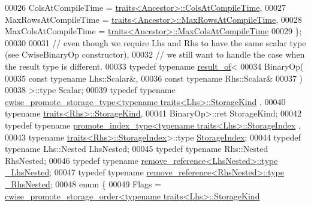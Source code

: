 \begin{DoxyCode}
00026     ColsAtCompileTime = \hyperlink{struct_eigen_1_1internal_1_1traits}{traits<Ancestor>::ColsAtCompileTime},
00027     MaxRowsAtCompileTime = \hyperlink{struct_eigen_1_1internal_1_1traits}{traits<Ancestor>::MaxRowsAtCompileTime},
00028     MaxColsAtCompileTime = \hyperlink{struct_eigen_1_1internal_1_1traits}{traits<Ancestor>::MaxColsAtCompileTime}
00029   \};
00030 
00031   \textcolor{comment}{// even though we require Lhs and Rhs to have the same scalar type (see CwiseBinaryOp constructor),}
00032   \textcolor{comment}{// we still want to handle the case when the result type is different.}
00033   \textcolor{keyword}{typedef} \textcolor{keyword}{typename} \hyperlink{struct_eigen_1_1internal_1_1result__of}{result\_of}<
00034                      BinaryOp(
00035                        \textcolor{keyword}{const} \textcolor{keyword}{typename} Lhs::Scalar&,
00036                        \textcolor{keyword}{const} \textcolor{keyword}{typename} Rhs::Scalar&
00037                      )
00038                    >::type Scalar;
00039   \textcolor{keyword}{typedef} \textcolor{keyword}{typename} \hyperlink{struct_eigen_1_1internal_1_1cwise__promote__storage__type}{cwise\_promote\_storage\_type<typename traits<Lhs>::StorageKind}
      ,
00040                                               \textcolor{keyword}{typename} \hyperlink{struct_eigen_1_1internal_1_1traits}{traits<Rhs>::StorageKind},
00041                                               BinaryOp>::ret StorageKind;
00042   \textcolor{keyword}{typedef} \textcolor{keyword}{typename} \hyperlink{struct_eigen_1_1internal_1_1promote__index__type}{promote\_index\_type<typename traits<Lhs>::StorageIndex}
      ,
00043                                       \textcolor{keyword}{typename} \hyperlink{struct_eigen_1_1internal_1_1traits}{traits<Rhs>::StorageIndex}>::type 
      \hyperlink{struct_eigen_1_1internal_1_1conditional}{StorageIndex};
00044   \textcolor{keyword}{typedef} \textcolor{keyword}{typename} Lhs::Nested LhsNested;
00045   \textcolor{keyword}{typedef} \textcolor{keyword}{typename} Rhs::Nested RhsNested;
00046   \textcolor{keyword}{typedef} \textcolor{keyword}{typename} \hyperlink{group___sparse_core___module}{remove\_reference<LhsNested>::type} 
      \hyperlink{group___sparse_core___module}{\_LhsNested};
00047   \textcolor{keyword}{typedef} \textcolor{keyword}{typename} \hyperlink{group___sparse_core___module}{remove\_reference<RhsNested>::type} 
      \hyperlink{group___sparse_core___module}{\_RhsNested};
00048   \textcolor{keyword}{enum} \{
00049     Flags = \hyperlink{struct_eigen_1_1internal_1_1cwise__promote__storage__order}{cwise\_promote\_storage\_order<typename traits<Lhs>::StorageKind}

\end{DoxyCode}
